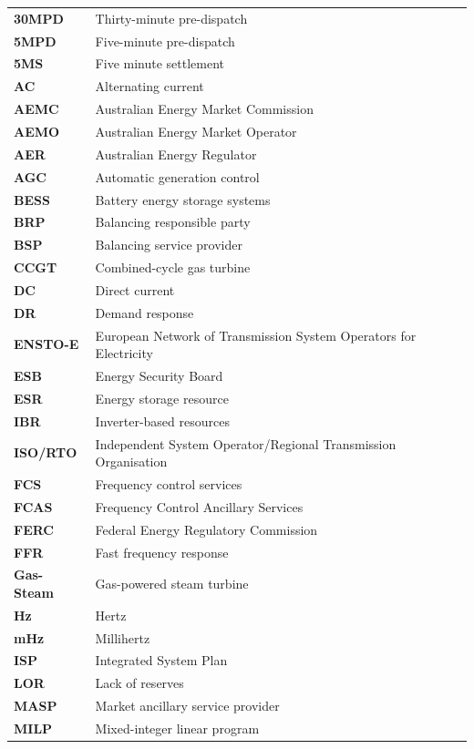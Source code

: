 \documentclass[12pt,a4paper,]{report}
\begin{document}
\begin{longtable}[l]{l l}
\textbf{30MPD} & Thirty-minute pre-dispatch \\
\textbf{5MPD} & Five-minute pre-dispatch \\
\textbf{5MS} & Five minute settlement \\
\textbf{AC} & Alternating current \\
\textbf{AEMC} & Australian Energy Market Commission \\ 
\textbf{AEMO} & Australian Energy Market Operator \\
\textbf{AER} & Australian Energy Regulator \\
\textbf{AGC} & Automatic generation control \\
\textbf{BESS} & Battery energy storage systems \\
\textbf{BRP} & Balancing responsible party \\
\textbf{BSP} & Balancing service provider \\
\textbf{CCGT} & Combined-cycle gas turbine \\
\textbf{DC} & Direct current \\
\textbf{DR} & Demand response \\
\textbf{ENSTO-E} & European Network of Transmission System Operators for Electricity \\
\textbf{ESB} & Energy Security Board \\
\textbf{ESR} & Energy storage resource \\
\textbf{IBR} & Inverter-based resources \\
\textbf{ISO/RTO} &  Independent System Operator/Regional Transmission Organisation \\
\textbf{FCS} & Frequency control services \\
\textbf{FCAS} & Frequency Control Ancillary Services \\
\textbf{FERC} & Federal Energy Regulatory Commission \\
\textbf{FFR} & Fast frequency response \\
\textbf{Gas-Steam} & Gas-powered steam turbine \\
\textbf{Hz} & Hertz \\
\textbf{mHz} & Millihertz \\
\textbf{ISP} & Integrated System Plan \\
\textbf{LOR} & Lack of reserves \\
\textbf{MASP} & Market ancillary service provider \\
\textbf{MILP} & Mixed-integer linear program \\

\end{longtable}
\end{document}
